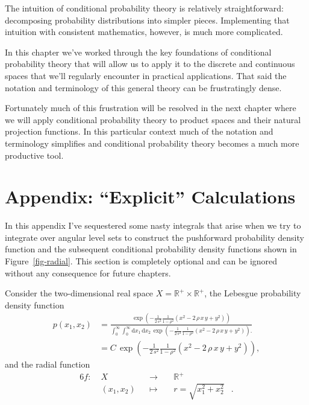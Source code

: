 \documentclass[
  letterpaper,
  DIV=11,
  numbers=noendperiod]{scrartcl}
\begin{document}
The intuition of conditional probability theory is relatively
straightforward: decomposing probability distributions into simpler
pieces. Implementing that intuition with consistent mathematics,
however, is much more complicated.

In this chapter we've worked through the key foundations of conditional
probability theory that will allow us to apply it to the discrete and
continuous spaces that we'll regularly encounter in practical
applications. That said the notation and terminology of this general
theory can be frustratingly dense.

Fortunately much of this frustration will be resolved in the next
chapter where we will apply conditional probability theory to product
spaces and their natural projection functions. In this particular
context much of the notation and terminology simplifies and conditional
probability theory becomes a much more productive tool.

\section*{Appendix: ``Explicit'' Calculations}\label{sec:appendix}

In this appendix I've sequestered some nasty integrals that arise when
we try to integrate over angular level sets to construct the pushforward
probability density function and the subsequent conditional probability
density functions shown in Figure~\ref{fig-radial}. This section is
completely optional and can be ignored without any consequence for
future chapters.

Consider the two-dimensional real space
\(X = \mathbb{R}^{+} \times \mathbb{R}^{+}\), the Lebesgue probability
density function \begin{align*}
p(x_{1}, x_{2})
&=
\frac{
\exp \left( - \frac{1}{2 \, s^{2}} \frac{1}{1 - \rho^{2}}
              ( x^{2} - 2 \, \rho \, x \, y + y^{2} ) \right)
}{
\int_{0}^{\infty} \int_{0}^{\infty}
\mathrm{d} x_{1} \, \mathrm{d} x_{2} \,
\exp \left( - \frac{1}{2 \, s^{2}} \frac{1}{1 - \rho^{2}}
             ( x^{2} - 2 \, \rho \, x \, y + y^{2} ) \right).
}
\\
&=
C \, \exp \left( - \frac{1}{2 \, s^{2}} \frac{1}{1 - \rho^{2}}
                   ( x^{2} - 2 \, \rho \, x \, y + y^{2} ) \right),
\end{align*} and the radial function \begin{alignat*}{6}
f :\; &X& &\rightarrow& \; &\mathbb{R}^{+}&
\\
&(x_{1}, x_{2})& &\mapsto& &r = \sqrt{ x_{1}^{2} + x_{2}^{2} }&.
\end{alignat*}
\end{document}
